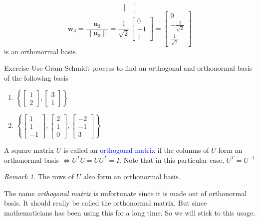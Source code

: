 \documentclass{beamer}
\theoremstyle{definition}
\theoremstyle{remark}
\newtheorem*{remark}{Remark}
\begin{document}
\begin{frame}[t]
\begin{example}
\[\begin{bmatrix}
\end{bmatrix}
\]
\[
\mathbf w_3=\frac{\mathbf u_3}{\|\mathbf u_3\|}=\frac{1}{\sqrt2}\begin{bmatrix}
0\\-1\\1
\end{bmatrix}=\begin{bmatrix}
0\\-\frac{1}{\sqrt2}\\\frac{1}{\sqrt2}
\end{bmatrix}
\]
is an orthonormal basis.
\end{example}
\end{frame}

\begin{frame}[t]{Exercise}
Use Gram-Schmidt process to find an orthogonal and orthonormal basis of the following basis
\begin{enumerate}
\item $\left\{\begin{bmatrix}1\\2\end{bmatrix},\begin{bmatrix}3\\1\end{bmatrix}\right\}$\pause
\item $\left\{\begin{bmatrix}1\\1\\-1\end{bmatrix},\begin{bmatrix}2\\1\\0\end{bmatrix},\begin{bmatrix}-2\\-1\\3\end{bmatrix}\right\}$
\end{enumerate}
\end{frame}

\begin{frame}[t]
\begin{definition}
A square matrix $U$ is called an \textcolor{blue}{orthogonal matrix} if  the columns of $U$ form an orthonormal basis $\iff U^TU=UU^T=I$. Note that in this particular case, $U^T=U^{-1}$
\end{definition}
\pause
\begin{remark}
The rows of $U$ also form an orthonormal basis.
\end{remark}
\pause
\begin{note}
The name \textit{orthogonal matrix} is unfortunate since it is made out of orthonormal basis. It should really be called the orthonormal matrix. But since mathematicians has been using this for a long time. So we will stick to this usage.
\end{note}
\end{frame}
\end{document}
